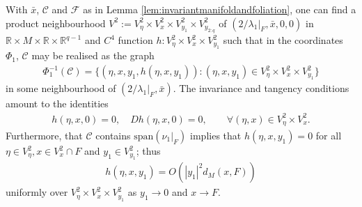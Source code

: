 \documentclass{article}
\newcommand{\RB}{\mathbb{R}}
\newcommand{\FC}{\mathcal{F}}
\newcommand{\CC}{\mathcal{C}}
\theoremstyle{plain}
\theoremstyle{definition}
\theoremstyle{remark}
\begin{document}
With $\bar{x}$, $\CC$ and $\FC$ as in Lemma \ref{lem:invariantmanifoldandfoliation}, one can find a product neighbourhood $V^2:=V^2_{\eta}\times V^2_x\times V^2_{y_1}\times V^2_{y_{2:q}}$ of $(2/\lambda_1|_F,\bar{x},0,0)$ in $\RB\times M\times \RB\times\RB^{q-1}$ and $C^4$ function $h:V^2_{\eta}\times V^2_x\times V^2_{y_1}$ such that in the coordinates $\Phi_1$, $\CC$ may be realised as the graph
\begin{align}
    \Phi_1^{-1}(\CC) = \{(\eta,x,y_1,h(\eta,x,y_1)):(\eta,x,y_1)\in V^2_{\eta}\times V^2_x\times V^2_{y_1}\}
\end{align}
in some neighbourhood of $(2/\lambda_1|_F,\bar{x})$. The invariance and tangency conditions amount to the identities
\begin{align}\label{eq:h1}
    h(\eta,x,0) = 0,\quad Dh(\eta,x,0) = 0,\qquad \forall (\eta,x)\in V^2_{\eta}\times V^2_x.
\end{align} 
Furthermore, that $\CC$ contains $\mathrm{span}(\nu_1|_F)$ implies that $h(\eta,x,y_1) = 0$ for all $\eta\in V^2_{\eta},x\in V^2_x\cap F$ and $y_1\in V^2_{y_1}$; thus
\begin{align}\label{eq:h2}
    h(\eta,x,y_1) = O(|y_1|^2d_M(x,F))
\end{align}
uniformly over $V^2_{\eta}\times V^2_x\times V^2_{y_1}$ as $y_1\rightarrow 0$ and $x\rightarrow F$.
\end{document}
